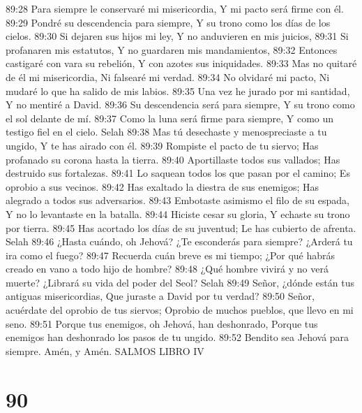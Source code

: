 89:28 Para siempre le conservaré mi misericordia, 
Y mi pacto será firme con él. 
89:29 Pondré su descendencia para siempre, 
Y su trono como los días de los cielos. 
89:30 Si dejaren sus hijos mi ley, 
Y no anduvieren en mis juicios, 
89:31 Si profanaren mis estatutos, 
Y no guardaren mis mandamientos, 
89:32 Entonces castigaré con vara su rebelión, 
Y con azotes sus iniquidades. 
89:33 Mas no quitaré de él mi misericordia, 
Ni falsearé mi verdad. 
89:34 No olvidaré mi pacto, 
Ni mudaré lo que ha salido de mis labios. 
89:35 Una vez he jurado por mi santidad, 
Y no mentiré a David. 
89:36 Su descendencia será para siempre, 
Y su trono como el sol delante de mí. 
89:37 Como la luna será firme para siempre, 
Y como un testigo fiel en el cielo. Selah 
89:38 Mas tú desechaste y menospreciaste a tu ungido, 
Y te has airado con él. 
89:39 Rompiste el pacto de tu siervo; 
Has profanado su corona hasta la tierra. 
89:40 Aportillaste todos sus vallados; 
Has destruido sus fortalezas. 
89:41 Lo saquean todos los que pasan por el camino; 
Es oprobio a sus vecinos. 
89:42 Has exaltado la diestra de sus enemigos; 
Has alegrado a todos sus adversarios. 
89:43 Embotaste asimismo el filo de su espada, 
Y no lo levantaste en la batalla. 
89:44 Hiciste cesar su gloria, 
Y echaste su trono por tierra. 
89:45 Has acortado los días de su juventud; 
Le has cubierto de afrenta. Selah 
89:46 ¿Hasta cuándo, oh Jehová? ¿Te esconderás para siempre? 
¿Arderá tu ira como el fuego? 
89:47 Recuerda cuán breve es mi tiempo; 
¿Por qué habrás creado en vano a todo hijo de hombre? 
89:48 ¿Qué hombre vivirá y no verá muerte? 
¿Librará su vida del poder del Seol? Selah 
89:49 Señor, ¿dónde están tus antiguas misericordias, 
Que juraste a David por tu verdad? 
89:50 Señor, acuérdate del oprobio de tus siervos; 
Oprobio de muchos pueblos, que llevo en mi seno. 
89:51 Porque tus enemigos, oh Jehová, han deshonrado, 
Porque tus enemigos han deshonrado los pasos de tu ungido. 
89:52 Bendito sea Jehová para siempre. 
Amén, y Amén.
SALMOS 
LIBRO IV

\chapter{90}

